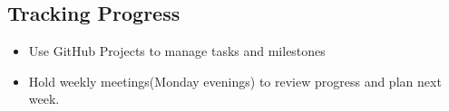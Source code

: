 \documentclass[]{VUMIFTemplateClass}
\begin{document}
\subsection*{Tracking Progress}
\begin{itemize}
    \item Use GitHub Projects to manage tasks and milestones
    \item Hold weekly meetings(Monday evenings) to review progress and plan next week.
\end{itemize}

\printbibliography[title = {References and sources}]






\end{document}
